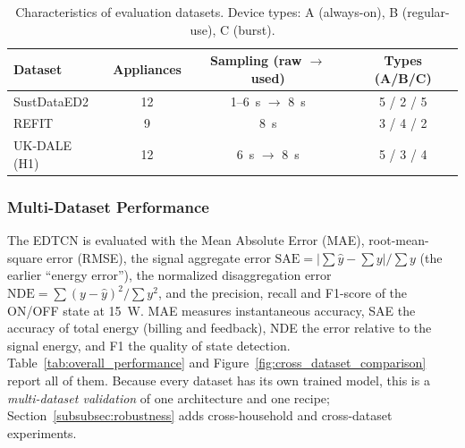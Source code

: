 \documentclass[fleqn,10pt]{wlscirep}
\begin{document}
\begin{table}[!t]
\centering
\caption{Characteristics of evaluation datasets. Device types: A (always-on), B (regular-use), C (burst).}
\label{tab:dataset_characteristics}
\footnotesize
\begin{tabular}{@{}lccc@{}}
\toprule
Dataset & Appliances & Sampling (raw $\rightarrow$ used) & Types (A/B/C) \\
\midrule
SustDataED2 & 12 & 1--6~s $\rightarrow$ 8~s & 5 / 2 / 5 \\
REFIT & 9 & 8~s & 3 / 4 / 2 \\
UK-DALE (H1) & 12 & 6~s $\rightarrow$ 8~s & 5 / 3 / 4 \\
\bottomrule
\end{tabular}
\end{table}

\subsubsection{Multi-Dataset Performance}
\label{subsubsec:performance}

The EDTCN is evaluated with the Mean Absolute Error (MAE), root-mean-square error (RMSE), the signal aggregate error $\mathrm{SAE}=|\sum\hat{y}-\sum y|/\sum y$ (the earlier ``energy error''), the normalized disaggregation error $\mathrm{NDE}=\sum(y-\hat{y})^2/\sum y^2$, and the precision, recall and F1-score of the ON/OFF state at 15~W. MAE measures instantaneous accuracy, SAE the accuracy of total energy (billing and feedback), NDE the error relative to the signal energy, and F1 the quality of state detection. Table~\ref{tab:overall_performance} and Figure~\ref{fig:cross_dataset_comparison} report all of them. Because every dataset has its own trained model, this is a \textit{multi-dataset validation} of one architecture and one recipe; Section~\ref{subsubsec:robustness} adds cross-household and cross-dataset experiments.
\end{document}
